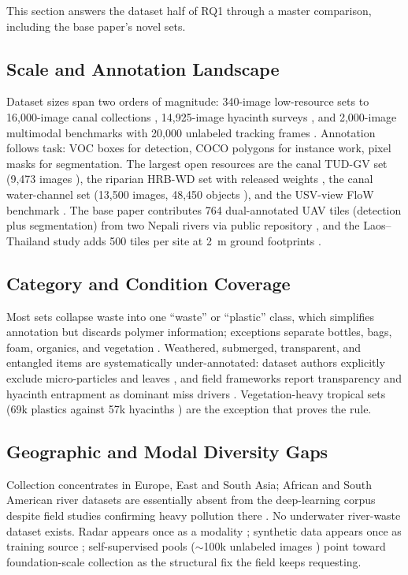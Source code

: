 \documentclass[12pt]{article}
\begin{document}
This section answers the dataset half of RQ1 through a master comparison, including the base paper's novel sets.

\subsection{Scale and Annotation Landscape}
Dataset sizes span two orders of magnitude: 340-image low-resource sets \cite{Putra2021} to 16,000-image canal collections \cite{Qiao2022}, 14,925-image hyacinth surveys \cite{Saigon2025}, and 2,000-image multimodal benchmarks with 20,000 unlabeled tracking frames \cite{Cheng2021}. Annotation follows task: VOC boxes for detection, COCO polygons for instance work, pixel masks for segmentation. The largest open resources are the canal TUD-GV set (9,473 images \cite{JiaFrontiers2023}), the riparian HRB-WD set with released weights \cite{Pan2024}, the canal water-channel set (13,500 images, 48,450 objects \cite{Tharani2021}), and the USV-view FloW benchmark \cite{Cheng2021}. The base paper contributes 764 dual-annotated UAV tiles (detection plus segmentation) from two Nepali rivers via public repository \cite{Pati2025}, and the Laos--Thailand study adds 500 tiles per site at 2~m ground footprints \cite{Maharjan2022}.

\subsection{Category and Condition Coverage}
Most sets collapse waste into one ``waste'' or ``plastic'' class, which simplifies annotation but discards polymer information; exceptions separate bottles, bags, foam, organics, and vegetation \cite{Lin2021,Nunkhaw2024,Tharani2021}. Weathered, submerged, transparent, and entangled items are systematically under-annotated: dataset authors explicitly exclude micro-particles and leaves \cite{Tharani2021}, and field frameworks report transparency and hyacinth entrapment as dominant miss drivers \cite{JiaFlux2025,Nunkhaw2025}. Vegetation-heavy tropical sets (69k plastics against 57k hyacinths \cite{Saigon2025}) are the exception that proves the rule.

\subsection{Geographic and Modal Diversity Gaps}
Collection concentrates in Europe, East and South Asia; African and South American river datasets are essentially absent from the deep-learning corpus despite field studies confirming heavy pollution there \cite{Atuhaire2025}. No underwater river-waste dataset exists. Radar appears once as a modality \cite{Cheng2021}; synthetic data appears once as training source \cite{Pan2023}; self-supervised pools ($\sim$100k unlabeled images \cite{JiaSwAV2024}) point toward foundation-scale collection as the structural fix the field keeps requesting.
\end{document}
